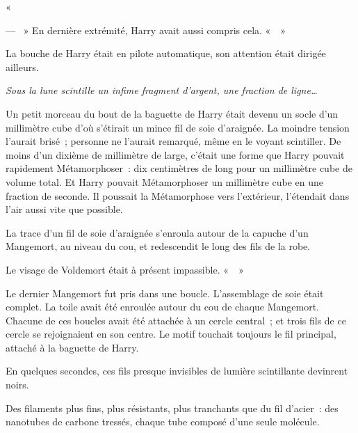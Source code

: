 «~

--- ~» En dernière extrémité, Harry avait aussi compris cela.
«~~»

La bouche de Harry était en pilote automatique, son attention était dirigée ailleurs.

\emph{Sous la lune scintille un infime fragment d'argent, une fraction de ligne…}

Un petit morceau du bout de la baguette de Harry était devenu un socle d'un millimètre cube d'où s'étirait un mince fil de soie d'araignée.
La moindre tension l'aurait brisé~; personne ne l'aurait remarqué, même en le voyant scintiller.
De moins d'un dixième de millimètre de large, c'était une forme que Harry pouvait rapidement Métamorphoser~: dix centimètres de long pour un millimètre cube de volume total.
Et Harry pouvait Métamorphoser un millimètre cube en une fraction de seconde.
Il poussait la Métamorphose vers l'extérieur, l'étendait dans l'air aussi vite que possible.

La trace d'un fil de soie d'araignée s'enroula autour de la capuche d'un Mangemort, au niveau du cou, et redescendit le long des fils de la robe.

Le visage de Voldemort était à présent impassible.
«~~»

Le dernier Mangemort fut pris dans une boucle.
L'assemblage de soie était complet.
La toile avait été enroulée autour du cou de chaque Mangemort.
Chacune de ces boucles avait été attachée à un cercle central~; et trois fils de ce cercle se rejoignaient en son centre.
Le motif touchait toujours le fil principal, attaché à la baguette de Harry.

En quelques secondes, ces fils presque invisibles de lumière scintillante devinrent noirs.

Des filaments plus fins, plus résistants, plus tranchants que du fil d'acier~: des nanotubes de carbone tressés, chaque tube composé d'une seule molécule.

